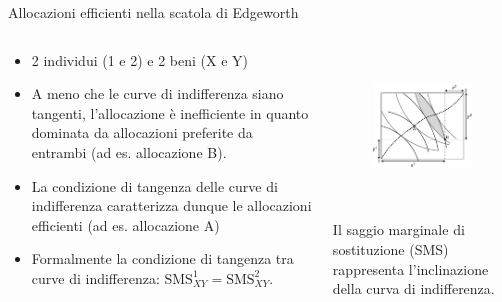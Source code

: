 \documentclass[aspectratio=64,12pt]{beamer}
\begin{document}
\begin{frame}{Allocazioni efficienti nella scatola di Edgeworth}
\begin{columns}
\begin{column}{.5\columnwidth}
\fontsize{11}{11}\selectfont
\begin{itemize}
\item 2 individui (1 e 2) e 2 beni (X e Y)
\item A meno che le curve di indifferenza siano tangenti, l’allocazione è inefficiente in quanto dominata da allocazioni preferite da entrambi (ad es. allocazione B).
\item La condizione di tangenza delle curve di indifferenza caratterizza dunque le allocazioni efficienti (ad es. allocazione A)
\item Formalmente la condizione di tangenza
tra curve di indifferenza: $\text{SMS}^1_{XY}=\text{SMS}^2_{XY}$.
\end{itemize}
\end{column}
\begin{column}{.5\columnwidth}
\footnotesize

\begin{figure}
\centering
\includegraphics[height=4cm]{./figure/edgeworth-1.pdf}
\end{figure}

Il saggio marginale di sostituzione (SMS) rappresenta l’inclinazione della curva di indifferenza. 
\end{column}
\end{columns}
\end{frame}
\end{document}
